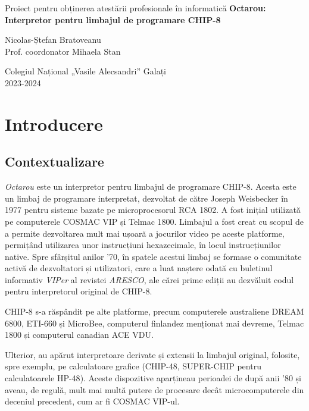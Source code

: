 \documentclass[a4paper]{article}
\begin{document}
\begin{titlepage}
	\begin{center}
		\Large Proiect pentru obținerea atestării profesionale în informatică
		\vfill
		\LARGE\textbf{Octarou: Interpretor pentru limbajul de programare CHIP-8}

		\vspace{8pt}
		\Large Nicolas-Ștefan Bratoveanu \\
		\large Prof. coordonator Mihaela Stan

		\vfill
		\Large
		Colegiul Național „Vasile Alecsandri” Galați \\
		2023-2024
	\end{center}
\end{titlepage}

\tableofcontents
\newpage

\section{Introducere}
\subsection{Contextualizare}
\textit{Octarou} este un interpretor pentru limbajul de programare CHIP-8. Acesta este un limbaj de programare interpretat, dezvoltat
de către Joseph Weisbecker în 1977 pentru sisteme bazate pe microprocesorul RCA 1802. A fost inițial utilizată pe computerele COSMAC VIP și Telmac
1800. Limbajul a fost creat cu scopul de a permite dezvoltarea mult mai ușoară a jocurilor video pe aceste platforme, permițând utilizarea unor
instrucțiuni hexazecimale, în locul instrucțiunilor native\cite{langhoff}. Spre sfârșitul anilor '70, în spatele acestui limbaj se formase o comunitate activă
de dezvoltatori și utilizatori, care a luat naștere odată cu buletinul informativ \textit{VIPer} al revistei \textit{ARESCO}, ale cărei prime
ediții au dezvăluit codul pentru interpretorul original de CHIP-8.

CHIP-8 s-a răspândit pe alte platforme, precum computerele australiene DREAM 6800, ETI-660 și MicroBee, computerul finlandez menționat mai devreme,
Telmac 1800 și computerul canadian ACE VDU\cite{langhoff}.

Ulterior, au apărut interpretoare derivate și extensii la limbajul original, folosite, spre exemplu, pe calculatoare grafice (CHIP-48, SUPER-CHIP
pentru calculatoarele HP-48\cite{langhoff}). Aceste dispozitive aparțineau perioadei de după anii '80 și aveau, de regulă, mult mai multă putere de procesare
decât microcomputerele din deceniul precedent, cum ar fi COSMAC VIP-ul.
\end{document}
